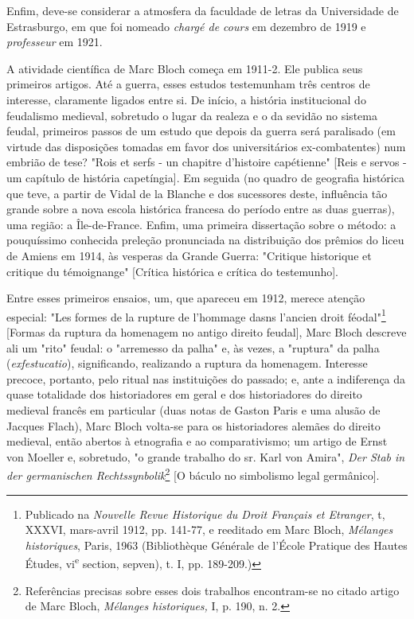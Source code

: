 \documentclass[a5paper]{book}
\begin{document}
Enfim, deve-se considerar a atmosfera da faculdade de letras da Universidade de Estrasburgo, em que foi nomeado \emph{chargé de cours} em dezembro de 1919 e \emph{professeur} em 1921.

A atividade científica de Marc Bloch começa em 1911-2. Ele publica seus primeiros artigos. Até a guerra, esses estudos testemunham três centros de interesse, claramente ligados entre si. De início, a história institucional do feudalismo medieval, sobretudo o lugar da realeza e o da sevidão no sistema feudal, primeiros passos de um estudo que depois da guerra será paralisado (em virtude das disposições tomadas em favor dos universitários ex-combatentes) num embrião de tese? "Rois et serfs - un chapitre d'histoire capétienne" [Reis e servos - um capítulo de história capetíngia]. Em seguida (no quadro de geografia histórica que teve, a partir de Vidal de la Blanche e dos sucessores deste, influência tão grande sobre a nova escola histórica francesa do período entre as duas guerras), uma região: a Île-de-France. Enfim, uma primeira dissertação sobre o método: a pouquíssimo conhecida preleção pronunciada na distribuição dos prêmios do liceu de Amiens em 1914, às vesperas da Grande Guerra: "Critique historique et critique du témoignange" [Crítica histórica e crítica do testemunho].

\begin{sloppypar}Entre esses primeiros ensaios, um, que apareceu em 1912, merece atenção especial: \foreignlanguage{french}{"Les formes de la rupture de l'hommage dasns l'ancien droit féodal"}\footnote{Publicado na \emph{Nouvelle Revue Historique du Droit Français et Etranger}, t, XXXVI, mars-avril 1912, pp. 141-77, e reeditado em Marc Bloch, \emph{Mélanges historiques}, Paris, 1963 (Bibliothèque Générale de l'École Pratique des Hautes Études, vi\textsuperscript e \textnormal section, sepven), t. I, pp. 189-209.)} [Formas da ruptura da homenagem no antigo direito feudal], Marc Bloch descreve ali um "rito" feudal: o "arremesso da palha" e, às vezes, a "ruptura" da palha (\emph{exfestucatio}), significando, realizando a ruptura da homenagem. Interesse precoce, portanto, pelo ritual nas instituições do passado; e, ante a indiferença da quase totalidade dos historiadores em geral e dos historiadores do direito medieval francês em particular (duas notas de Gaston Paris e uma alusão de Jacques Flach), Marc Bloch volta-se para os historiadores alemães do direito medieval, então abertos à etnografia e ao comparativismo; um artigo de Ernst von Moeller e, sobretudo, "o grande trabalho do sr. Karl von Amira", \emph{Der Stab in der germanischen Rechtssynbolik}\footnote{Referências precisas sobre esses dois trabalhos encontram-se no citado artigo de Marc Bloch, \emph{Mélanges historiques,} I, p. 190, n. 2.} [O báculo no simbolismo legal germânico].\end{sloppypar}
\end{document}
